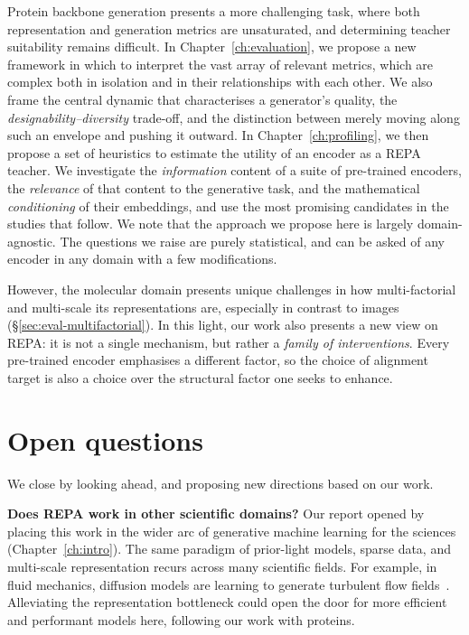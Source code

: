 \documentclass[12pt,a4paper,twoside]{report}
\begin{document}
Protein backbone generation presents a more challenging task, where both representation and generation metrics are unsaturated, and determining teacher suitability remains difficult. In Chapter~\ref{ch:evaluation}, we propose a new framework in which to interpret the vast array of relevant metrics, which are complex both in isolation and in their relationships with each other. We also frame the central dynamic that characterises a generator's quality, the \emph{designability--diversity} trade-off, and the distinction between merely moving along such an envelope and pushing it outward. In Chapter~\ref{ch:profiling}, we then propose a set of heuristics to estimate the utility of an encoder as a REPA teacher. We investigate the \emph{information} content of a suite of pre-trained encoders, the \emph{relevance} of that content to the generative task, and the mathematical \emph{conditioning} of their embeddings, and use the most promising candidates in the studies that follow. We note that the approach we propose here is largely domain-agnostic. The questions we raise are purely statistical, and can be asked of any encoder in any domain with a few modifications.

However, the molecular domain presents unique challenges in how multi-factorial and multi-scale its representations are, especially in contrast to images (\S\ref{sec:eval-multifactorial}). In this light, our work also presents a new view on REPA: it is not a single mechanism, but rather a \emph{family of interventions}. Every pre-trained encoder emphasises a different factor, so the choice of alignment target is also a choice over the structural factor one seeks to enhance.

\section{Open questions}
\label{sec:conc-open-questions}

We close by looking ahead, and proposing new directions based on our work.

\textbf{Does REPA work in other scientific domains?} Our report opened by placing this work in the wider arc of generative machine learning for the sciences (Chapter~\ref{ch:intro}). The same paradigm of prior-light models, sparse data, and multi-scale representation recurs across many scientific fields. For example, in fluid mechanics, diffusion models are learning to generate turbulent flow fields~\cite{TurbulenceDiffusion}. Alleviating the representation bottleneck could open the door for more efficient and performant models here, following our work with proteins.
\end{document}
